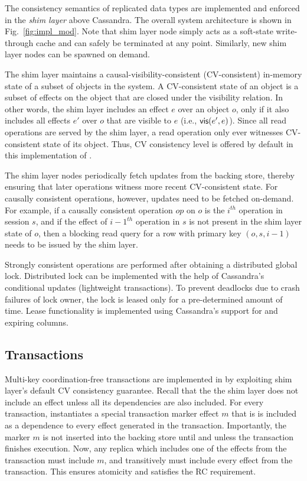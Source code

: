 The consistency semantics of replicated data types are implemented and
enforced in the \emph{shim layer} above Cassandra. The overall system
architecture is shown in Fig.~\ref{fig:impl_mod}. Note that shim layer
node simply acts as a soft-state write-through cache and can safely be
terminated at any point. Similarly, new shim layer nodes can be
spawned on demand.

The shim layer maintains a causal-visibility-consistent
(CV-consistent) in-memory state of a subset of objects in the system.
A CV-consistent state of an object is a subset of effects on the
object that are closed under the visibility relation.  In other words,
the shim layer includes an effect $e$ over an object $o$, only if it
also includes all effects $e'$ over $o$ that are visible to $e$ (i.e.,
${\normalfont \textsf{vis}(e',e)}$). Since all read operations are served by the shim
layer, a read operation only ever witnesses CV-consistent state of its
object. Thus, CV consistency level is offered by default in this
implementation of \name.

The shim layer nodes periodically fetch updates from the backing
store, thereby ensuring that later operations witness more recent
CV-consistent state. For causally consistent operations, however,
updates need to be fetched on-demand. For example, if a causally
consistent operation $op$ on $o$ is the $i^{th}$ operation in session
$s$, and if the effect of ${i-1}^{th}$ operation in $s$ is not present
in the shim layer state of $o$, then a blocking read query for a row
with primary key $(o,s,i-1)$ needs to be issued by the shim layer.

Strongly consistent operations are performed after obtaining a
distributed global lock. Distributed lock can be implemented with the
help of Cassandra's conditional updates (lightweight transactions). To
prevent deadlocks due to crash failures of lock owner, the lock is
leased only for a pre-determined amount of time. Lease functionality
is implemented using Cassandra's support for and expiring columns.

\subsection{Transactions}

Multi-key coordination-free transactions are implemented in \name by
exploiting shim layer's default CV consistency guarantee. Recall that
the the shim layer does not include an effect unless all its
dependencies are also included. For every transaction, \name
instantiates a special transaction marker effect $m$ that is is
included as a dependence to every effect generated in the transaction.
Importantly, the marker $m$ is not inserted into the backing store
until and unless the transaction finishes execution. Now, any replica
which includes one of the effects from the transaction must include
$m$, and transitively must include every effect from the transaction.
This ensures atomicity and satisfies the RC requirement.

